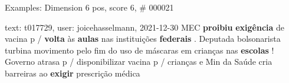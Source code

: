 \begin{frame}{Examples: Dimension 6 pos, score 6, \# 000021}
\footnotesize
\begin{exampleblock}{text: t017729, user: joicehasselmann, 2021-12-30}
MEC \textbf{proibiu} \textbf{exigência} de vacina p / \textbf{volta} às 
\textbf{aulas} nas instituições \textbf{federais} . Deputada bolsonarista 
turbina movimento pelo fim do uso de máscaras em crianças nas \textbf{escolas} 
! Governo atrasa p / disponibilizar vacina p / crianças e Min da Saúde cria 
barreiras ao \textbf{exigir} prescrição médica 
\end{exampleblock}
\end{frame}
